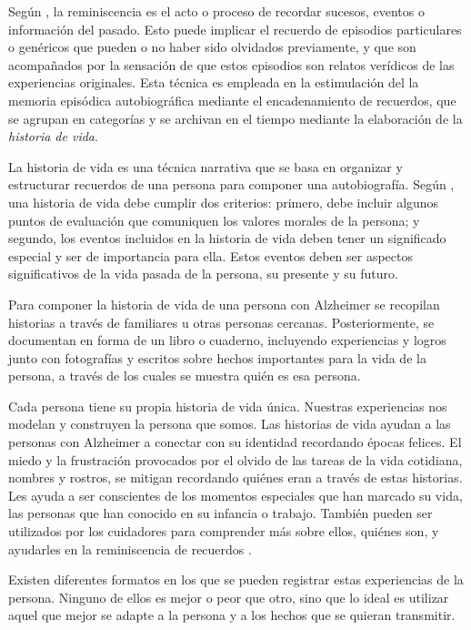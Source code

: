 Según \cite{o2013cross}, la reminiscencia es el acto o proceso de recordar sucesos, eventos o información del pasado. Esto puede implicar el recuerdo de episodios particulares o genéricos que pueden o no haber sido olvidados previamente, y que son acompañados por la sensación de que estos episodios son relatos verídicos de las experiencias originales. Esta técnica es empleada en la estimulación del la memoria episódica autobiográfica mediante el encadenamiento de recuerdos, que se agrupan en categorías y se archivan en el tiempo mediante la elaboración de la \textit{historia de vida}.

La historia de vida es una técnica narrativa que se basa en organizar y estructurar recuerdos de una persona para componer una autobiografía. Según \cite{linde1993life}, una historia de vida debe cumplir dos criterios: primero, debe incluir algunos puntos de evaluación que comuniquen los valores morales de la persona; y segundo, los eventos incluidos en la historia de vida deben tener un significado especial y ser de importancia para ella. Estos eventos deben ser aspectos significativos de la vida pasada de la persona, su presente y su futuro.

Para componer la historia de vida de una persona con Alzheimer se recopilan historias a través de familiares u otras personas cercanas. Posteriormente, se documentan en forma de un libro o cuaderno, incluyendo experiencias y logros junto con fotografías y escritos sobre hechos importantes para la vida de la persona, a través de los cuales se muestra quién es esa persona.

Cada persona tiene su propia historia de vida única. Nuestras experiencias nos modelan y construyen la persona que somos. Las historias de vida ayudan a las personas con Alzheimer a conectar con su identidad recordando épocas felices. El miedo y la frustración provocados por el olvido de las tareas de la vida cotidiana, nombres y rostros, se mitigan recordando quiénes eran a través de estas historias. Les ayuda a ser conscientes de los momentos especiales que han marcado su vida, las personas que han conocido en su infancia o trabajo. También pueden ser utilizados por los cuidadores para comprender más sobre ellos, quiénes son, y ayudarles en la reminiscencia de recuerdos \citep{karlsson2014stories}.


Existen diferentes formatos en los que se pueden registrar estas experiencias de la persona. Ninguno de ellos es mejor o peor que otro, sino que lo ideal es utilizar aquel que mejor se adapte a la persona y a los hechos que se quieran transmitir.

